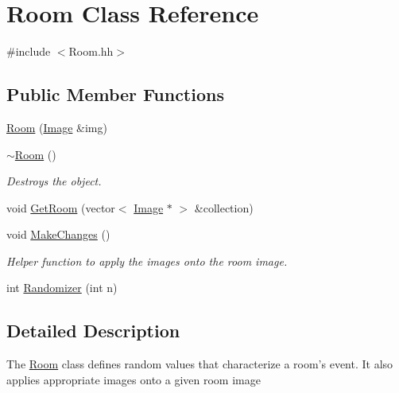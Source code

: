 \hypertarget{classRoom}{\section{Room Class Reference}
\label{classRoom}
}


{\ttfamily \#include $<$Room.\-hh$>$}

\subsection*{Public Member Functions}
\begin{DoxyCompactItemize}
\item 
\hyperlink{classRoom_a755646673335862f28b57d5600b6fd30}{Room} (\hyperlink{classImage}{Image} \&img)
\item 
\hypertarget{classRoom_a67d5da09983cc53097807fd43ba5481a}{\hyperlink{classRoom_a67d5da09983cc53097807fd43ba5481a}{$\sim$\-Room} ()}\label{classRoom_a67d5da09983cc53097807fd43ba5481a}

\begin{DoxyCompactList}\small\item\em Destroys the object. \end{DoxyCompactList}\item 
void \hyperlink{classRoom_a267a11891afd9d608fd47f69c812f0e6}{Get\-Room} (vector$<$ \hyperlink{classImage}{Image} $\ast$ $>$ \&collection)
\item 
\hypertarget{classRoom_a74aefefa4c161799ca709a7f1d681ed2}{void \hyperlink{classRoom_a74aefefa4c161799ca709a7f1d681ed2}{Make\-Changes} ()}\label{classRoom_a74aefefa4c161799ca709a7f1d681ed2}

\begin{DoxyCompactList}\small\item\em Helper function to apply the images onto the room image. \end{DoxyCompactList}\item 
int \hyperlink{classRoom_a40f49471cbd82ece2b78cabbcd576a1f}{Randomizer} (int n)
\end{DoxyCompactItemize}


\subsection{Detailed Description}
The \hyperlink{classRoom}{Room} class defines random values that characterize a room's event. It also applies appropriate images onto a given room image 

